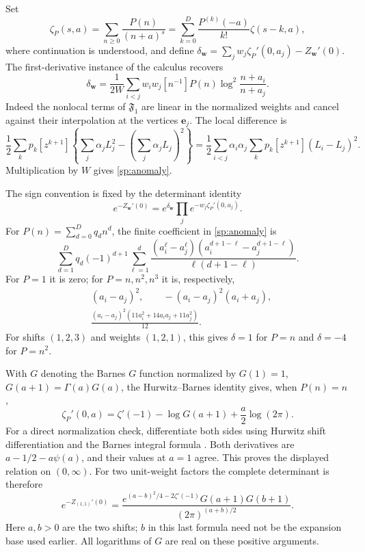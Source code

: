 Set
\begin{equation}\label{sp:single}
 \zeta_P(s,a)=\sum_{n\ge0}\frac{P(n)}{(n+a)^s}
       =\sum_{k=0}^D\frac{P^{(k)}(-a)}{k!}\zeta(s-k,a),
\end{equation}
where continuation is understood, and define
$\delta_{\boldsymbol w}=\sum_jw_j\zeta_P'(0,a_j)
-Z_{\boldsymbol w}'(0)$. The first-derivative instance of the calculus
recovers
\begin{equation}\label{sp:anomaly}
 \boxed{\delta_{\boldsymbol w}
   =\frac1{2W}\sum_{i<j}w_iw_j[n^{-1}]P(n)
                 \log^2\frac{n+a_i}{n+a_j}.}
\end{equation}
Indeed the nonlocal terms of $\mathfrak F_1$ are linear in the
normalized weights and cancel against their interpolation at the
vertices $\boldsymbol e_j$. The local difference is
\[
 \frac12\sum_kp_k[z^{k+1}]
 \left\{\sum_j\alpha_jL_j^2-
           \left(\sum_j\alpha_jL_j\right)^2\right\}
 =\frac12\sum_{i<j}\alpha_i\alpha_j
              \sum_kp_k[z^{k+1}](L_i-L_j)^2.
\]
Multiplication by $W$ gives \eqref{sp:anomaly}.

The sign convention is fixed by the determinant identity
\begin{equation}\label{sp:determinant}
 e^{-Z_{\boldsymbol w}'(0)}
   =e^{\delta_{\boldsymbol w}}
                     \prod_j e^{-w_j\zeta_P'(0,a_j)}.
\end{equation}
For $P(n)=\sum_{d=0}^Dq_dn^d$, the finite coefficient in
\eqref{sp:anomaly} is
\begin{equation}\label{sp:pairpolynomial}
 \sum_{d=1}^Dq_d(-1)^{d+1}
   \sum_{\ell=1}^d
   \frac{(a_i^\ell-a_j^\ell)
         (a_i^{d+1-\ell}-a_j^{d+1-\ell})}{\ell(d+1-\ell)}.
\end{equation}
For $P=1$ it is zero; for $P=n,n^2,n^3$ it is, respectively,
\begin{align*}
 &(a_i-a_j)^2,\qquad -(a_i-a_j)^2(a_i+a_j),\\
 &\frac{(a_i-a_j)^2(11a_i^2+14a_ia_j+11a_j^2)}{12}.
\end{align*}
For shifts $(1,2,3)$ and weights $(1,2,1)$, this gives
$\delta=1$ for $P=n$ and $\delta=-4$ for $P=n^2$.

With $G$ denoting the Barnes $G$ function normalized by $G(1)=1$,
$G(a+1)=\Gamma(a)G(a)$, the Hurwitz--Barnes identity gives, when $P(n)=n$,
\begin{equation}\label{sp:Barnes}
 \zeta_P'(0,a)=\zeta'(-1)-\log G(a+1)+\frac a2\log(2\pi).
\end{equation}
For a direct normalization check, differentiate both sides using
Hurwitz shift differentiation and the Barnes integral formula
\cite[Eq.~5.17.4]{dlmf}. Both derivatives are
$a-1/2-a\psi(a)$, and their values at $a=1$ agree. This proves the
displayed relation on $(0,\infty)$.
For two unit-weight factors the complete determinant is therefore
\begin{equation}\label{sp:Barnesdet}
 e^{-Z_{(1,1)}'(0)}
 =\frac{e^{(a-b)^2/4-2\zeta'(-1)}G(a+1)G(b+1)}
             {(2\pi)^{(a+b)/2}}.
\end{equation}
Here $a,b>0$ are the two shifts; $b$ in this last formula need not be
the expansion base used earlier. All logarithms of $G$ are real on
these positive arguments.

